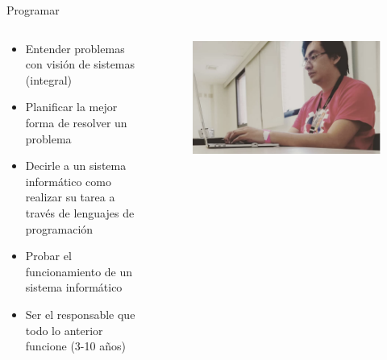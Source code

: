 \documentclass[aspectratio=169]{beamer}
\begin{document}
\begin{frame}{Programar}


    \begin{columns}[T] %
	     \begin{column}[T]{0.5\textwidth} %
			    \begin{itemize}[<+->]
                       \item Entender problemas con visión de sistemas (integral)
                       \item Planificar la mejor forma de resolver un problema
                       \item Decirle a un sistema informático como realizar su tarea a través de lenguajes de programación
                       \item Probar el funcionamiento de un sistema informático
                       \item Ser el responsable que todo lo anterior funcione (3-10 años)
                \end{itemize}
	     \end{column}
	     \begin{column}[T]{4cm} %
   			\begin{figure}
                       \centering
                       \includegraphics[width=\linewidth]{Images/yo}
                   \end{figure}

	     \end{column}
     \end{columns}
\end{frame}
\end{document}
